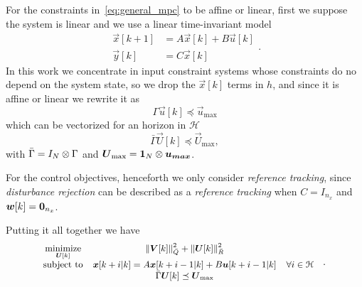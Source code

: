 \documentclass[../main.tex]{subfiles}
\begin{document}
For the constraints in~\eqref{eq:general_mpc} to be affine or linear, first we suppose the system is linear and we use a linear time-invariant model
\begin{equation}\label{eq:large_scale_system_model}
  \begin{array}{rl}
    \vec{x}[k+1]&=A\vec{x}[k]+B\vec{u}[k]\\
    \vec{y}[k]&=C\vec{x}[k]
  \end{array}
.
\end{equation}
In this work we concentrate in input constraint systems whose constraints do no depend on the system state, so we drop the $\vec{x}[k]$ terms in $h$, and since it is affine or linear we rewrite it as
\begin{equation}
  \Gamma\vec{u}[k]\preceq\vec{u}_{\max}
\end{equation}
which can be vectorized for an horizon in $\mathcal{H}$
\begin{equation}
\bar{\Gamma}\vec{U}[k]\preceq {\vec{U}}_{\text{max}},
\end{equation}
with ${ \bar{\Gamma}=I_{N}\otimes\Gamma }$ and ${ \boldsymbol{U}_{\max}=\mathbf{1}_{N}\otimes\boldsymbol{u_{max}} }$.

For the control objectives, henceforth we only consider \emph{reference tracking}, since \emph{disturbance rejection} can be described as a \emph{reference tracking} when ${ C=I_{n_{x}} }$ and ${ \boldsymbol{w}[k]=\mathbf{0}_{n_{x}} }$.

Putting it all together we have
\begin{equation}
  \small
  \begin{aligned}
    \begin{matrix}
      \underset{\boldsymbol{U}[k]}{\mathrm{minimize}} &\left\lVert\boldsymbol{V}[k]\right\rVert^{2}_{\bar{Q}} + \left\lVert\boldsymbol{U}[k] \right\rVert^{2}_{\bar{R}}&\\
      \mathrm{subject~ to} &
      \boldsymbol{x}[k+i|k]=A\boldsymbol{x}[k+i-1|k]+B\boldsymbol{u}[k+i-1|k]
      &
       \forall i\in\mathcal{H} \\
      &\bar{\Gamma}\boldsymbol{U}[k]\preceq {\boldsymbol{U}}_{\text{max}}&

    \end{matrix}
  \end{aligned}
  \label{eq:general_qp}
  \quad.
\end{equation}
\end{document}
